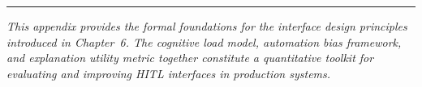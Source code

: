 \bigskip
\begin{center}
\rule{0.5\textwidth}{0.4pt}
\end{center}
\bigskip

\noindent\textit{This appendix provides the formal foundations for the interface design principles introduced in Chapter~6. The cognitive load model, automation bias framework, and explanation utility metric together constitute a quantitative toolkit for evaluating and improving HITL interfaces in production systems.}
\apxnumoff
